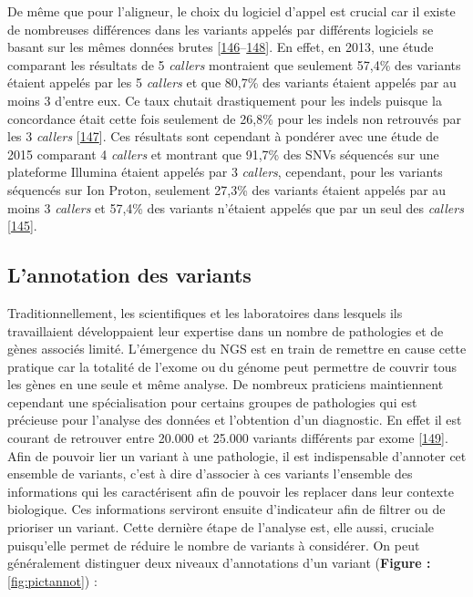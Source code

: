 \documentclass[12pt,a4paper,twoside]{ugathesis}
\theoremstyle{definition}
\theoremstyle{definition}
\theoremstyle{definition}
\theoremstyle{remark}
\begin{document}
De même que pour l'aligneur, le choix du logiciel d'appel est crucial
car il existe de nombreuses différences dans les variants appelés par
différents logiciels se basant sur les mêmes données brutes
{[}\protect\hyperlink{ref-Baes2014}{146}--\protect\hyperlink{ref-Rosenfeld2012}{148}{]}.
En effet, en 2013, une étude comparant les résultats de 5 \emph{callers}
montraient que seulement 57,4\% des variants étaient appelés par les 5
\emph{callers} et que 80,7\% des variants étaient appelés par au moins 3
d'entre eux. Ce taux chutait drastiquement pour les indels puisque la
concordance était cette fois seulement de 26,8\% pour les indels non
retrouvés par les 3 \emph{callers}
{[}\protect\hyperlink{ref-ORawe2013}{147}{]}. Ces résultats sont
cependant à pondérer avec une étude de 2015 comparant 4 \emph{callers}
et montrant que 91,7\% des SNVs séquencés sur une plateforme Illumina
étaient appelés par 3 \emph{callers}, cependant, pour les variants
séquencés sur Ion Proton, seulement 27,3\% des variants étaient appelés
par au moins 3 \emph{callers} et 57,4\% des variants n'étaient appelés
que par un seul des \emph{callers}
{[}\protect\hyperlink{ref-Hwang2015}{145}{]}.

\newpage

\subsection{L'annotation des variants}\label{lannotation-des-variants}

Traditionnellement, les scientifiques et les laboratoires dans lesquels
ils travaillaient développaient leur expertise dans un nombre de
pathologies et de gènes associés limité. L'émergence du NGS est en train
de remettre en cause cette pratique car la totalité de l'exome ou du
génome peut permettre de couvrir tous les gènes en une seule et même
analyse. De nombreux praticiens maintiennent cependant une
spécialisation pour certains groupes de pathologies qui est précieuse
pour l'analyse des données et l'obtention d'un diagnostic. En effet il
est courant de retrouver entre 20.000 et 25.000 variants différents par
exome {[}\protect\hyperlink{ref-Gonzaga-Jauregui2012}{149}{]}. Afin de
pouvoir lier un variant à une pathologie, il est indispensable d'annoter
cet ensemble de variants, c'est à dire d'associer à ces variants
l'ensemble des informations qui les caractérisent afin de pouvoir les
replacer dans leur contexte biologique. Ces informations serviront
ensuite d'indicateur afin de filtrer ou de prioriser un variant. Cette
dernière étape de l'analyse est, elle aussi, cruciale puisqu'elle permet
de réduire le nombre de variants à considérer. On peut généralement
distinguer deux niveaux d'annotations d'un variant (\textbf{Figure :}
\ref{fig:pictannot}) :
\end{document}

